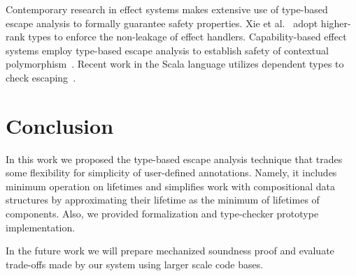 \documentclass[11pt]{article}
\begin{document}
    Contemporary research in effect systems makes extensive use of type-based escape analysis to formally guarantee safety properties.
    Xie et al.~\cite{xie2022first} adopt higher-rank types to enforce the non-leakage of effect handlers.
    Capability-based effect systems employ type-based escape analysis to establish safety of contextual polymorphism~\cite{osvald2016gentrification, brachthauser2020effects, brachthauser2022effects}.
    Recent work in the Scala language utilizes dependent types to check escaping~\cite{boruch2023capturing}.



    \section{Conclusion}

    In this work we proposed the type-based escape analysis technique that trades some flexibility for simplicity of user-defined annotations.
    Namely, it includes minimum operation on lifetimes and simplifies work with compositional data structures by approximating their lifetime as the minimum of lifetimes of components.
    Also, we provided formalization and type-checker prototype implementation.

    In the future work we will prepare mechanized soundness proof and evaluate trade-offs made by our system using larger scale code bases.


    
    
\end{document}
